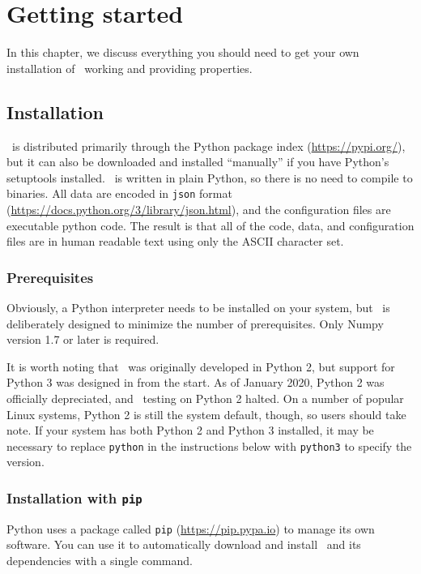 \chapter{Getting started}\label{ch:start}

In this chapter, we discuss everything you should need to get your own installation of \PM\ working and providing properties.

\section{Installation}

\PM\ is distributed primarily through the Python package index (\url{https://pypi.org/}), but it can also be downloaded and installed ``manually'' if you have Python's setuptools installed.  \PM\ is written in plain Python, so there is no need to compile to binaries.  All data are encoded in \texttt{json} format (\url{https://docs.python.org/3/library/json.html}), and the configuration files are executable python code.  The result is that all of the code, data, and configuration files are in human readable text using only the ASCII character set.

\subsection{Prerequisites}

Obviously, a Python interpreter needs to be installed on your system, but \PM\ is deliberately designed to minimize the number of prerequisites.  Only Numpy version 1.7 or later is required.

It is worth noting that \PM\ was originally developed in Python 2, but support for Python 3 was designed in from the start.  As of January 2020, Python 2 was officially depreciated, and \PM\ testing on Python 2 halted.  On a number of popular Linux systems, Python 2 is still the system default, though, so users should take note.  If your system has both Python 2 and Python 3 installed, it may be necessary to replace \texttt{python} in the instructions below with \texttt{python3} to specify the version.

\subsection{Installation with \texttt{pip}}

Python uses a package called \texttt{pip} (\url{https://pip.pypa.io}) to manage its own software.  You can use it to automatically download and install \PM\ and its dependencies with a single command.

